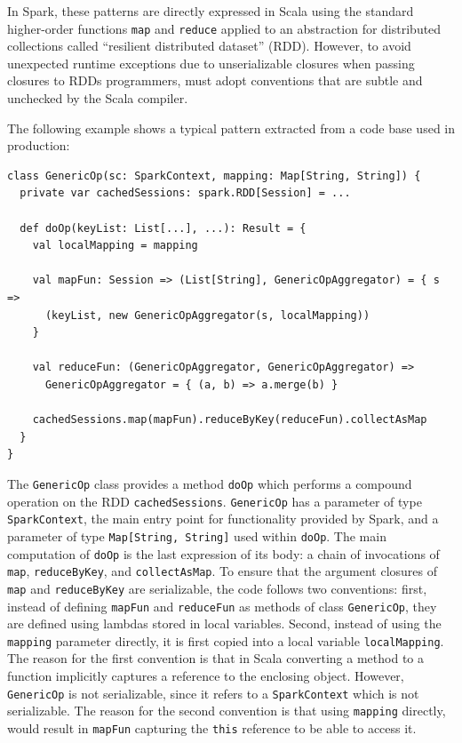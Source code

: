 \documentclass{llncs}
\begin{document}
In Spark, these patterns are directly expressed in Scala using the standard higher-order functions \verb|map| and \verb|reduce| applied to an abstraction for distributed collections called ``resilient distributed dataset'' (RDD). However, to avoid unexpected runtime exceptions due to unserializable closures when passing closures to RDDs programmers, must adopt conventions that are subtle and unchecked by the Scala compiler.

The following example shows a typical pattern extracted from a code base used in production:

\begin{lstlisting}
class GenericOp(sc: SparkContext, mapping: Map[String, String]) {
  private var cachedSessions: spark.RDD[Session] = ...

  def doOp(keyList: List[...], ...): Result = {
    val localMapping = mapping

    val mapFun: Session => (List[String], GenericOpAggregator) = { s =>
      (keyList, new GenericOpAggregator(s, localMapping))
    }

    val reduceFun: (GenericOpAggregator, GenericOpAggregator) =>
      GenericOpAggregator = { (a, b) => a.merge(b) }

    cachedSessions.map(mapFun).reduceByKey(reduceFun).collectAsMap
  }
}
\end{lstlisting}
\noindent
The \verb|GenericOp| class provides a method \verb|doOp| which performs a compound operation on the RDD \verb|cachedSessions|. \verb|GenericOp| has a parameter of type \verb|SparkContext|, the main entry point for functionality provided by Spark, and a parameter of type \verb|Map[String, String]| used within \verb|doOp|. The main computation of \verb|doOp| is the last expression of its body: a chain of invocations of \verb|map|, \verb|reduceByKey|, and \verb|collectAsMap|. To ensure that the argument closures of \verb|map| and \verb|reduceByKey| are serializable, the code follows two conventions: first, instead of defining \verb|mapFun| and \verb|reduceFun| as methods of class \verb|GenericOp|, they are defined using lambdas stored in local variables. Second, instead of using the \verb|mapping| parameter directly, it is first copied into a local variable \verb|localMapping|. The reason for the first convention is that in Scala converting a method to a function implicitly captures a reference to the enclosing object. However, \verb|GenericOp| is not serializable, since it refers to a \verb|SparkContext| which is not serializable. The reason for the second convention is that using \verb|mapping| directly, would result in \verb|mapFun| capturing the \verb|this| reference to be able to access it.
\end{document}
